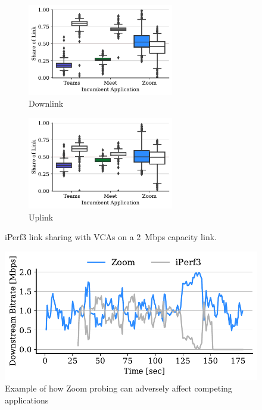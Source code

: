 \begin{figure}[t!]
\centering
\begin{subfigure}[t]{.5\textwidth}
    \centering
    \includegraphics[width=0.7\textwidth]{figures/comp/box_plot_iperf_dl_2.0_all.pdf}
    \caption{Downlink}
    \label{subfig:boxplot-iperf-dl}
\end{subfigure}\hfill
\begin{subfigure}[t]{.5\textwidth}
    \centering
    \includegraphics[width=0.7\textwidth]{figures/comp/box_plot_iperfup_ul_2.0_all.pdf}
    \caption{Uplink}
    \label{subfig:boxplot-iperf-ul}
\end{subfigure}
\caption{iPerf3 link sharing with VCAs on a 2~Mbps capacity link.}
\label{fig:boxplot-iperf}
\end{figure}

\begin{figure}[th]
    \centering
    \includegraphics[width=\linewidth]{figures/comp_ts/zoom_iperf_2_dl_r3.pdf}
    \caption{Example of how Zoom probing can adversely affect competing applications}
	\label{fig:zoom-iperf-dl-2}
\end{figure}


